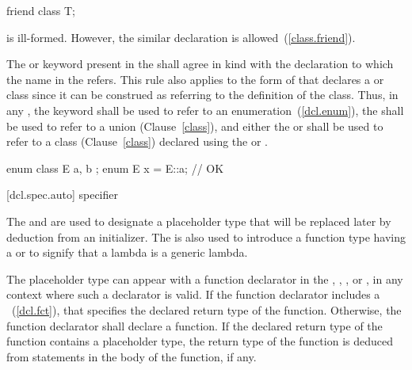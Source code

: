 \begin{codeblock}
friend class T;
\end{codeblock}

is ill-formed. However, the similar declaration  is allowed~(\ref{class.friend}).
\exitnote

\pnum
The  or  keyword
present in the
 shall agree in kind with the
declaration to which the name in the
 refers. This rule also applies to
the form of  that declares a
 or  class since it can be construed
as referring to the definition of the class. Thus, in any
, the  keyword
shall be
used to refer to an enumeration~(\ref{dcl.enum}), the 
 shall be used to refer to a union
(Clause~\ref{class}), and either the  or 
 shall be used to refer to a class
(Clause~\ref{class}) declared using the  or 
. \enterexample

\begin{codeblock}
enum class E { a, b };
enum E x = E::a;                // OK
\end{codeblock}
\exitexample

[dcl.spec.auto]{ specifier}%

\pnum
The  and  
are used to
designate a placeholder type that will be replaced later by deduction
from an initializer. The 
 is also used to
introduce a function type having a  or to
signify that a lambda is a generic lambda.

\pnum
The placeholder type can appear with a function declarator in the
, ,
, or ,
in any context where such a declarator is valid. If the function declarator
includes a ~(\ref{dcl.fct}), that
 specifies
the declared return type of the function. Otherwise, the function declarator
shall declare a function. If the declared return type of the
function contains a placeholder type, the return type of the function is
deduced from  statements in the body of the function, if any.

